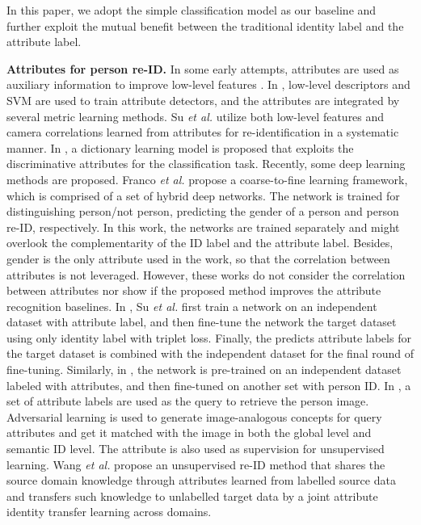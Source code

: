 \documentclass[5p,times,twocolumn]{elsarticle}
\begin{document}
In this paper, we adopt the simple classification model as our baseline and further exploit the mutual benefit between the traditional identity label and the attribute label.

\textbf{Attributes for person re-ID.}
In some early attempts, attributes are used as auxiliary information to improve low-level features \cite{su2017attributes,su2018multitask,layne2012person,liu2012attribute}. 
In \cite{layne2014re,layne2012person}, low-level descriptors and SVM are used to train attribute detectors, and the attributes are integrated by several metric learning methods. 
Su \emph{et al.} \cite{su2017attributes,su2018multitask}  utilize both low-level features and camera correlations learned from attributes for re-identification in a systematic manner.
In \cite{peng2016joint}, a dictionary learning model is proposed that exploits the discriminative attributes for the classification task. 
Recently, some deep learning methods are proposed.
Franco \emph{et al.} \cite{franco2017convolutional} propose a coarse-to-fine learning framework, which is comprised of a set of hybrid deep networks. The network is trained for distinguishing person/not person, predicting the gender of a person and person re-ID, respectively. In this work, the networks are trained separately and might overlook the complementarity of the ID label and the attribute label. Besides, gender is the only attribute used in the work, so that the correlation between attributes is not leveraged.
However, these works do not consider the correlation between attributes nor show if the proposed method improves the attribute recognition baselines.
In \cite{su2018multitype}, Su \emph{et al.} first train a network on an independent dataset with attribute label, and then fine-tune the network the target dataset using only identity label with triplet loss. Finally, the predicts attribute labels for the target dataset is combined with the independent dataset for the final round of fine-tuning. 
Similarly, in \cite{schumann2017person}, the network is pre-trained on an independent dataset labeled with attributes, and then fine-tuned on another set with person ID.
In \cite{ijcai2018-153}, a set of attribute labels are used as the query to retrieve the person image. Adversarial learning is used to generate image-analogous concepts for query attributes and get it matched with the image in both the global level and semantic ID level.
The attribute is also used as supervision for unsupervised learning. 
Wang \emph{et al.} \cite{Wang_2018_CVPR} propose an unsupervised re-ID method that shares the source domain knowledge through attributes learned from labelled source data and transfers such knowledge to unlabelled target data by a joint attribute identity transfer learning across domains.
\end{document}
